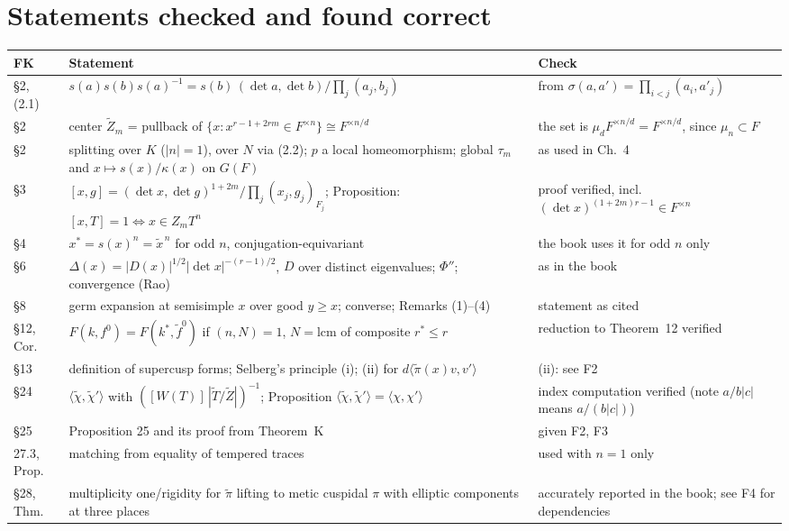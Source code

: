 \documentclass[12pt,letterpaper]{article}
\begin{document}
\section{Statements checked and found correct}

\begin{longtable}{p{}p{}p{}}
\toprule
FK & Statement & Check\\
\midrule
\S2, (2.1) & $s(a)s(b)s(a)^{-1}=s(b)\,(\det a,\det b)/\prod_j(a_j,b_j)$ & from $\sigma(a,a')=\prod_{i<j}(a_i,a'_j)$\\
\S2 & center $\widetilde Z_m$ = pullback of $\{x:x^{r-1+2rm}\in F^{\times n}\}\cong F^{\times n/d}$ & the set is $\mu_dF^{\times n/d}=F^{\times n/d}$, since $\mu_n\subset F$\\
\S2 & splitting over $K$ ($|n|=1$), over $N$ via (2.2); $p$ a local homeomorphism; global $\tau_m$ and $x\mapsto s(x)/\kappa(x)$ on $G(F)$ & as used in Ch.~4\\
\S3 & $[x,g]=(\det x,\det g)^{1+2m}/\prod_j(x_j,g_j)_{F_j}$; Proposition: $[x,T]=1\iff x\in Z_mT^n$ & proof verified, incl.\ $(\det x)^{(1+2m)r-1}\in F^{\times n}$\\
\S4 & $x^*=s(x)^n=\tilde x^{\,n}$ for odd $n$, conjugation-equivariant & the book uses it for odd $n$ only\\
\S6 & $\Delta(x)=|D(x)|^{1/2}|\det x|^{-(r-1)/2}$, $D$ over distinct eigenvalues; $\Phi''$; convergence (Rao) & as in the book\\
\S8 & germ expansion at semisimple $x$ over good $y\ge x$; converse; Remarks (1)--(4) & statement as cited\\
\S12, Cor. & $F(k,f^0)=F(k^*,\tilde f^0)$ if $(n,N)=1$, $N=\mathrm{lcm}$ of composite $r^*\le r$ & reduction to Theorem~12 verified\\
\S13 & definition of supercusp forms; Selberg's principle (i); (ii) for $d\langle\tilde\pi(x)v,v'\rangle$ & (ii): see F2\\
\S24 & $\langle\tilde\chi,\tilde\chi'\rangle$ with $([W(T)]\,|\widetilde T/\widetilde Z|)^{-1}$; Proposition $\langle\tilde\chi,\tilde\chi'\rangle=\langle\chi,\chi'\rangle$ & index computation verified (note $a/b|c|$ means $a/(b|c|)$)\\
\S25 & Proposition 25 and its proof from Theorem~K & given F2, F3\\
27.3, Prop. & matching from equality of tempered traces & used with $n=1$ only\\
\S28, Thm. & multiplicity one/rigidity for $\tilde\pi$ lifting to metic cuspidal $\pi$ with elliptic components at three places & accurately reported in the book; see F4 for dependencies\\
\bottomrule
\end{longtable}
\end{document}
